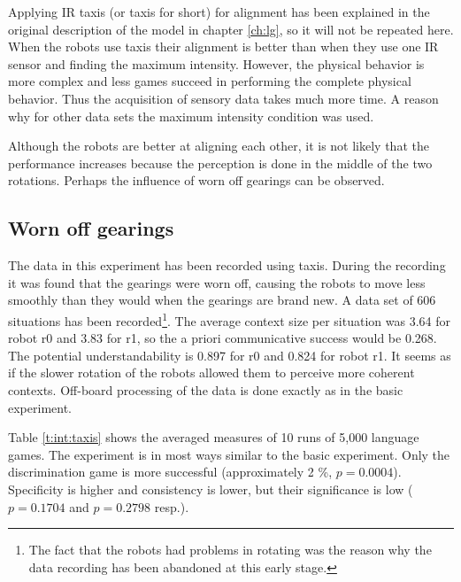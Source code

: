 Applying IR taxis (or taxis for short) for alignment has been explained in the original description of the model in chapter \ref{ch:lg}, so it will not be repeated here. When the robots use taxis their alignment is better than when they use one IR sensor and finding the maximum intensity. However, the physical behavior is more complex and less games succeed in performing the complete physical behavior. Thus the acquisition of sensory data takes much more time. A reason why for other data sets the maximum intensity condition was used. 

Although the robots are better at aligning each other, it is not likely that the performance increases because the perception is done in the middle of the two rotations. Perhaps the influence of worn off gearings can be observed.

\subsection{Worn off gearings}

The data in this experiment has been recorded using taxis. During the recording it was found that the gearings were worn off, causing the robots to move less smoothly than they would when the gearings are brand new. A data set of 606 situations has been recorded\footnote{The fact that the robots had problems in rotating was the reason why the data recording has been abandoned at this early stage.}. The average context size per situation was 3.64 for robot r0 and 3.83 for r1, so the a priori communicative success would be 0.268. The potential understandability is 0.897 for r0 and 0.824 for robot r1. It seems as if the slower rotation of the robots allowed them to perceive more coherent contexts. Off-board processing of the data is done exactly as in the basic experiment.

\p
Table \ref{t:int:taxis} shows the averaged measures of 10 runs of 5,000 language games. The experiment is in most ways similar to the basic experiment. Only the discrimination game is more successful (approximately 2 \%, $p=0.0004$). Specificity is higher and consistency is lower, but their significance is low ($p=0.1704$ and $p=0.2798$ resp.).


